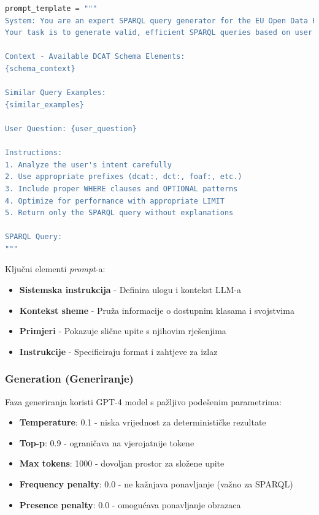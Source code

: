 \begin{lstlisting}[language=Python, caption=Struktura obogaćenog prompta za LLM]
prompt_template = """
System: You are an expert SPARQL query generator for the EU Open Data Portal.
Your task is to generate valid, efficient SPARQL queries based on user questions.

Context - Available DCAT Schema Elements:
{schema_context}

Similar Query Examples:
{similar_examples}

User Question: {user_question}

Instructions:
1. Analyze the user's intent carefully
2. Use appropriate prefixes (dcat:, dct:, foaf:, etc.)
3. Include proper WHERE clauses and OPTIONAL patterns
4. Optimize for performance with appropriate LIMIT
5. Return only the SPARQL query without explanations

SPARQL Query:
"""
\end{lstlisting}

Ključni elementi \textit{prompt}-a:

\begin{itemize}
    \item \textbf{Sistemska instrukcija} - Definira ulogu i kontekst LLM-a
    \item \textbf{Kontekst sheme} - Pruža informacije o dostupnim klasama i svojstvima
    \item \textbf{Primjeri} - Pokazuje slične upite s njihovim rješenjima
    \item \textbf{Instrukcije} - Specificiraju format i zahtjeve za izlaz
\end{itemize}

\subsubsection{Generation (Generiranje)}

Faza generiranja koristi GPT-4 model s pažljivo podešenim parametrima:

\begin{itemize}
    \item \textbf{Temperature}: 0.1 - niska vrijednost za determinističke rezultate
    \item \textbf{Top-p}: 0.9 - ograničava na vjerojatnije tokene
    \item \textbf{Max tokens}: 1000 - dovoljan prostor za složene upite
    \item \textbf{Frequency penalty}: 0.0 - ne kažnjava ponavljanje (važno za SPARQL)
    \item \textbf{Presence penalty}: 0.0 - omogućava ponavljanje obrazaca
\end{itemize}

